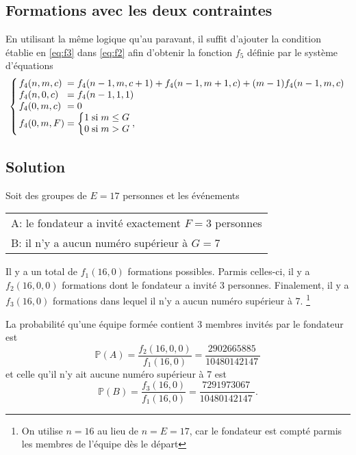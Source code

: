 \documentclass[11pt]{article}
\begin{document}
\subsection{Formations avec les deux contraintes}
En utilisant la même logique qu'au paravant, il suffit d'ajouter la condition
établie en \eqref{eq:f3} dans \eqref{eq:f2} afin d'obtenir la fonction $f_5$
définie par le système d'équations
\begin{equation}\label{eq:f2}
    \arraycolsep=1.4pt\def\arraystretch{1}
    \left\{
        \begin{array}{lcl}
            f_4(n,m,c)&=&f_4(n-1,m,c+1)+f_4(n-1,m+1,c)+(m-1)f_4(n-1,m,c)\\
            f_4(n,0,c)&=&f_4(n-1,1,1)\\
            f_4(0,m,c)&=&0\\
            f_4(0,m,F)&=&\left\{
                \begin{matrix}
                    1&\text{si}&m\leq G\\
                    0&\text{si}&m>    G\\
                \end{matrix}
            \right.,\\
        \end{array}
    \right.
\end{equation}

\subsection{Solution}
Soit des groupes de $E=17$ personnes et les événements
\begin{table}[H]
    \centering
    \begin{tabular}{l}
        A: le fondateur a invité exactement $F=3$ personnes\\
        B: il n'y a aucun numéro supérieur à $G=7$\\
    \end{tabular}
\end{table}

Il y a un total de $f_1(16,0)$ formations possibles. Parmis celles-ci, il y a
$f_2(16,0,0)$ formations dont le fondateur a invité 3 personnes. Finalement, il
y a $f_3(16,0)$ formations dans lequel il n'y a aucun numéro supérieur à 7.
\footnote{On utilise $n=16$ au lieu de $n=E=17$, car le fondateur est compté
parmis les membres de l'équipe dès le départ}

La probabilité qu'une équipe formée contient 3 membres invités par le fondateur est
\begin{equation*}
    \mathbb{P}(A)
    =\frac{f_2(16,0,0)}{f_1(16,0)}
    =\frac{\SI{2902665885}{}}{\SI{10480142147}{}}
\end{equation*}
et celle qu'il n'y ait aucune numéro supérieur à 7 est
\begin{equation*}
    \mathbb{P}(B)
    =\frac{f_3(16,0)}{f_1(16,0)}
    =\frac{\SI{7291973067}{}}{\SI{10480142147}{}}.
\end{equation*}
\end{document}
